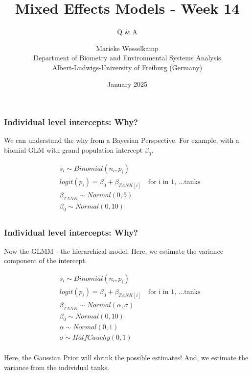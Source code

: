 \documentclass{beamer}
\title{Mixed Effects Models - Week 14}
\subtitle{Q \& A}
\author{Marieke Wesselkamp\\Department of Biometry and Environmental Systems Analysis\\Albert-Ludwigs-University of Freiburg (Germany)}
\date{January 2025}
\begin{document}
\frame{\titlepage}

\begin{frame}
    \frametitle{Individual level intercepts: Why?}

    We can understand the why from a Bayesian Perspective. For example, with a biomial GLM with grand population intercept $\beta_0$.
    
    \large
    \begin{align*}
        &s_i \sim Binomial(n_i, p_i) \\
        &logit(p_i) = \beta_0 + \beta_{TANK[i]} \quad \text{for i in 1, ...tanks}\\
        &\beta_{TANK} \sim Normal(0, 5) \\
        &\beta_0 \sim Normal(0, 10) \\
    \end{align*}
    
\end{frame}

\begin{frame}
    \frametitle{Individual level intercepts: Why?}

    Now the GLMM - the hierarchical model. Here, we estimate the variance component of the intercept.
    
    \large
    \begin{align*}
        &s_i \sim Binomial(n_i, p_i) \\
        &logit(p_i) = \beta_0 + \beta_{TANK[i]} \quad \text{for i in 1, ...tanks}\\
        &\beta_{TANK} \sim Normal(\alpha, \sigma) \\
        &\beta_0 \sim Normal(0, 10) \\
        &\alpha \sim Normal(0, 1) \\
        &\sigma \sim HalfCauchy(0, 1) \\
    \end{align*}

    Here, the Gaussian Prior will shrink the possible estimates! And, we estimate the variance from the individual tanks.
    
\end{frame}
\end{document}

